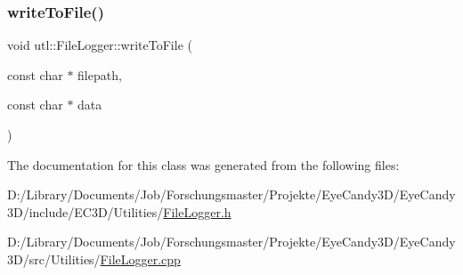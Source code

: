 \mbox{\label{classutl_1_1_file_logger_ac08928c13abec9fc8677ce286a382361}} 
\subsubsection{\texorpdfstring{write\+To\+File()}{writeToFile()}}
{\footnotesize\ttfamily void utl\+::\+File\+Logger\+::write\+To\+File (\begin{DoxyParamCaption}\item[{const char $\ast$}]{filepath,  }\item[{const char $\ast$}]{data }\end{DoxyParamCaption})\hspace{0.3cm}{\ttfamily [static]}}



The documentation for this class was generated from the following files\+:\begin{DoxyCompactItemize}
\item 
D\+:/\+Library/\+Documents/\+Job/\+Forschungsmaster/\+Projekte/\+Eye\+Candy3\+D/\+Eye\+Candy3\+D/include/\+E\+C3\+D/\+Utilities/\mbox{\hyperlink{_file_logger_8h}{File\+Logger.\+h}}\item 
D\+:/\+Library/\+Documents/\+Job/\+Forschungsmaster/\+Projekte/\+Eye\+Candy3\+D/\+Eye\+Candy3\+D/src/\+Utilities/\mbox{\hyperlink{_file_logger_8cpp}{File\+Logger.\+cpp}}\end{DoxyCompactItemize}
